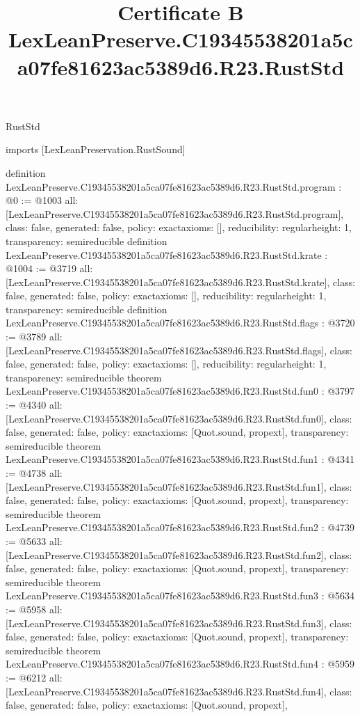 \begin{lexlean}{RustStd}
\title{Certificate B LexLeanPreserve.C19345538201a5ca07fe81623ac5389d6.R23.RustStd}
\begin{coremodule}
imports [LexLeanPreservation.RustSound]

definition LexLeanPreserve.C19345538201a5ca07fe81623ac5389d6.R23.RustStd.program : @0 := @1003 {
  all: [LexLeanPreserve.C19345538201a5ca07fe81623ac5389d6.R23.RustStd.program],
  class: false,
  generated: false,
  policy: exact{axioms: []},
  reducibility: regular{height: 1},
  transparency: semireducible
}
definition LexLeanPreserve.C19345538201a5ca07fe81623ac5389d6.R23.RustStd.krate : @1004 := @3719 {
  all: [LexLeanPreserve.C19345538201a5ca07fe81623ac5389d6.R23.RustStd.krate],
  class: false,
  generated: false,
  policy: exact{axioms: []},
  reducibility: regular{height: 1},
  transparency: semireducible
}
definition LexLeanPreserve.C19345538201a5ca07fe81623ac5389d6.R23.RustStd.flags : @3720 := @3789 {
  all: [LexLeanPreserve.C19345538201a5ca07fe81623ac5389d6.R23.RustStd.flags],
  class: false,
  generated: false,
  policy: exact{axioms: []},
  reducibility: regular{height: 1},
  transparency: semireducible
}
theorem LexLeanPreserve.C19345538201a5ca07fe81623ac5389d6.R23.RustStd.fun0 : @3797 := @4340 {
  all: [LexLeanPreserve.C19345538201a5ca07fe81623ac5389d6.R23.RustStd.fun0],
  class: false,
  generated: false,
  policy: exact{axioms: [Quot.sound, propext]},
  transparency: semireducible
}
theorem LexLeanPreserve.C19345538201a5ca07fe81623ac5389d6.R23.RustStd.fun1 : @4341 := @4738 {
  all: [LexLeanPreserve.C19345538201a5ca07fe81623ac5389d6.R23.RustStd.fun1],
  class: false,
  generated: false,
  policy: exact{axioms: [Quot.sound, propext]},
  transparency: semireducible
}
theorem LexLeanPreserve.C19345538201a5ca07fe81623ac5389d6.R23.RustStd.fun2 : @4739 := @5633 {
  all: [LexLeanPreserve.C19345538201a5ca07fe81623ac5389d6.R23.RustStd.fun2],
  class: false,
  generated: false,
  policy: exact{axioms: [Quot.sound, propext]},
  transparency: semireducible
}
theorem LexLeanPreserve.C19345538201a5ca07fe81623ac5389d6.R23.RustStd.fun3 : @5634 := @5958 {
  all: [LexLeanPreserve.C19345538201a5ca07fe81623ac5389d6.R23.RustStd.fun3],
  class: false,
  generated: false,
  policy: exact{axioms: [Quot.sound, propext]},
  transparency: semireducible
}
theorem LexLeanPreserve.C19345538201a5ca07fe81623ac5389d6.R23.RustStd.fun4 : @5959 := @6212 {
  all: [LexLeanPreserve.C19345538201a5ca07fe81623ac5389d6.R23.RustStd.fun4],
  class: false,
  generated: false,
  policy: exact{axioms: [Quot.sound, propext]},
}
\end{coremodule}
\end{lexlean}
